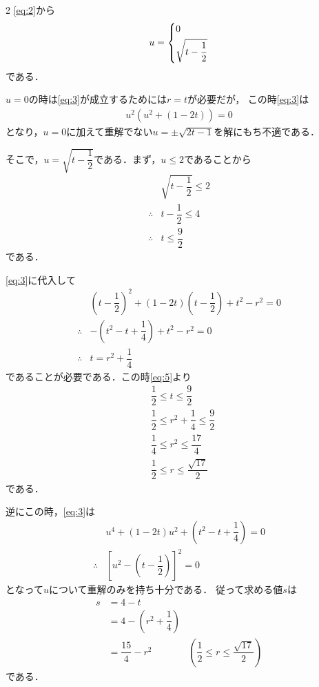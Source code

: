 \documentclass[../../main.tex]{subfiles}
\begin{document}
\begin{multicols}{2}
  \cref{eq:2}から
  \begin{align}
    u =
    \begin{dcases}
      0 \\
      \sqrt{t-\dfrac{1}{2}}
    \end{dcases}
  \end{align}
  である．

  $u=0$の時は\cref{eq:3}が成立するためには$r=t$が必要だが，
  この時\cref{eq:3}は
  \begin{align}
    u^2(u^2+(1-2t))=0
  \end{align}
  となり，$u=0$に加えて重解でない$u=\pm\sqrt{2t-1}$を解にもち不適である．

  そこで，$u=\sqrt{t-\dfrac{1}{2}}$である．まず，$u \le 2$であることから
  \begin{align}
    & \sqrt{t-\dfrac{1}{2}} \le 2          \\
    \therefore
    & t - \dfrac{1}{2} \le 4               \\
    \therefore
    & t \le \dfrac{9}{2} \label{eq:5}
  \end{align}
  である．

  \cref{eq:3}に代入して
  \begin{align}
    & \left(t-\dfrac{1}{2}\right)^2 + (1-2t)\left(t-\dfrac{1}{2}\right) + t^2 - r^2 = 0 \\
    \therefore
    & -\left(t^2-t+\dfrac{1}{4}\right) + t^2 - r^2 = 0                                 \\
    \therefore
    & t = r^2 + \dfrac{1}{4}
  \end{align}
  であることが必要である．この時\cref{eq:5}より
  \begin{align}
    & \dfrac{1}{2} \le t \le \dfrac{9}{2}                  \\
    & \dfrac{1}{2} \le  r^2 + \dfrac{1}{4} \le \dfrac{9}{2} \\
    & \dfrac{1}{4} \le  r^2  \le \dfrac{17}{4}             \\
    & \dfrac{1}{2} \le  r  \le \dfrac{\sqrt{17}}{2}
  \end{align}
  である．

  逆にこの時，\cref{eq:3}は
  \begin{align}
    & u^4 + (1-2t)u^2 + \left(t^2-t + \dfrac{1}{4}\right) = 0 \\
    \therefore
    & \left[u^2-\left(t-\dfrac{1}{2}\right)\right]^2 = 0
  \end{align}
  となって$u$について重解のみを持ち十分である．
  従って求める値$s$は
  \begin{align}
    s
    & = 4 - t                                                                                                           \\
    & = 4 - \left(r^2 + \dfrac{1}{4}\right)                                                                              \\
    & = \dfrac{15}{4} - r^2                 & \left(\dfrac{1}{2} \le  r  \le \dfrac{\sqrt{17}}{2}\right) \label{eq:6}
  \end{align}
  である．


\end{multicols}
\end{document}
